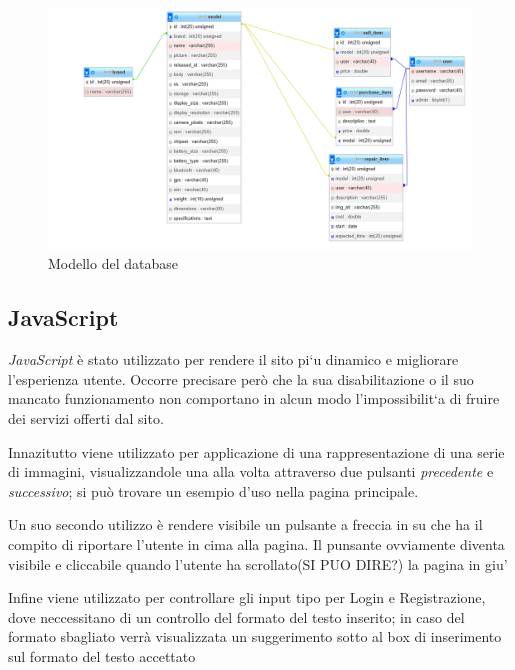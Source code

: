 \begin{figure}[H]
	\centering
	\includegraphics[scale=0.4]{res/database.png}
	\caption{Modello del database}
\end{figure}

\subsection{JavaScript}
\textit{JavaScript } è stato utilizzato per rendere il sito pi`u dinamico e migliorare l’esperienza utente. Occorre
precisare però che la sua disabilitazione o il suo mancato funzionamento non comportano in alcun
modo l’impossibilit`a di fruire dei servizi offerti dal sito.

Innazitutto viene utilizzato per applicazione di una rappresentazione di una serie di immagini, visualizzandole
una alla volta attraverso due pulsanti \textit{precedente} e \textit{successivo}; si può trovare un esempio d'uso
nella pagina principale.

Un suo secondo utilizzo è rendere visibile un pulsante a freccia in su che ha il compito di riportare l'utente
in cima alla pagina. Il punsante ovviamente diventa visibile e cliccabile quando l'utente ha scrollato(SI PUO DIRE?) la pagina in giu'

Infine viene utilizzato per controllare gli input tipo per Login e Registrazione, dove neccessitano di un controllo del formato
del testo inserito; in caso del formato sbagliato verrà visualizzata un suggerimento sotto al box di inserimento sul formato del
testo accettato